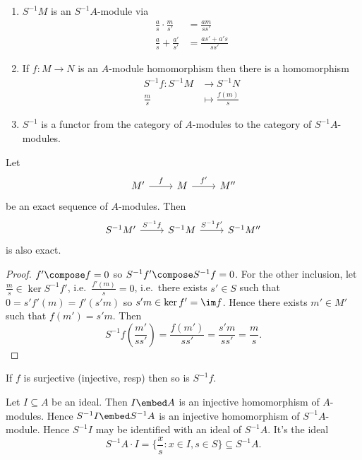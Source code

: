 \documentclass[a4paper]{article}
\begin{document}
\begin{ex}\leavevmode
  \begin{enumerate}
  \item \(S^{-1}M\) is an \(S^{-1}A\)-module via
    \begin{align*}
      \frac{a}{s} \cdot \frac{m}{s'} &= \frac{am}{ss'} \\
      \frac{a}{s} + \frac{a'}{s'} &= \frac{as' + a's}{ss'}
    \end{align*}
  \item If \(f: M \to N\) is an \(A\)-module homomorphism then there is a homomorphism
    \begin{align*}
      S^{-1}f: S^{-1}M &\to S^{-1}N \\
      \frac{m}{s} &\mapsto \frac{f(m)}{s}
    \end{align*}
  \item \(S^{-1}\) is a functor from the category of \(A\)-modules to the category of \(S^{-1}A\)-modules.
  \end{enumerate}
\end{ex}

\begin{lemma}
  Let
  \[
    \begin{tikzcd}
      M' \ar[r, "f"] & M \ar[r, "f'"] & M''
    \end{tikzcd}
  \]
  be an exact sequence of \(A\)-modules. Then
  \[
    \begin{tikzcd}
      S^{-1}M' \ar[r, "S^{-1}f"] & S^{-1}M \ar[r, "S^{-1}f'"] & S^{-1}M''
    \end{tikzcd}
  \]
  is also exact.
\end{lemma}

\begin{proof}
  \(f' \compose f = 0\) so \(S^{-1}f' \compose S^{-1} f = 0\). For the other inclusion, let \(\frac{m}{s} \in \ker S^{-1} f'\), i.e.\ \(\frac{f'(m)}{s} = 0\), i.e.\ there exists \(s' \in S\) such that \(0 = s'f'(m) = f'(s'm)\) so \(s'm \in \ker f' = \im f\). Hence there exists \(m' \in M'\) such that \(f(m') = s'm\). Then
  \[
    S^{-1}f (\frac{m'}{ss'}) = \frac{f(m')}{ss'} = \frac{s'm}{ss'} = \frac{m}{s}.
  \]
\end{proof}

\begin{corollary}
  If \(f\) is surjective (injective, resp) then so is \(S^{-1} f\).
\end{corollary}

Let \(I \subseteq A\) be an ideal. Then \(I \embed A\) is an injective homomorphism of \(A\)-modules. Hence \(S^{-1}I \embed S^{-1}A\) is an injective homomorphism of \(S^{-1}A\)-module. Hence \(S^{-1}I\) may be identified with an ideal of \(S^{-1}A\). It's the ideal
\[
  S^{-1}A \cdot I = \{\frac{x}{s}: x \in I, s \in S\} \subseteq S^{-1}A.
\]
\end{document}
